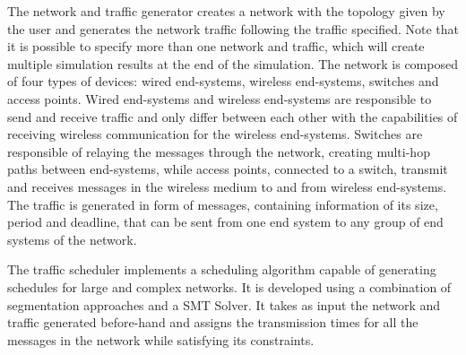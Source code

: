 \documentclass[conference]{IEEEtran}
\begin{document}
The network and traffic generator creates a network with the topology given by the user and generates the network traffic following the traffic specified. Note that it is possible to specify more than one network and traffic, which will create multiple simulation results at the end of the simulation. The network is composed of four types of devices: wired end-systems, wireless end-systems, switches and access points. Wired end-systems and wireless end-systems are responsible to send and receive traffic and only differ between each other with the capabilities of receiving wireless communication for the wireless end-systems. Switches are responsible of relaying the messages through the network, creating multi-hop paths between end-systems, while access points, connected to a switch, transmit and receives messages in the wireless medium to and from wireless end-systems. The traffic is generated in form of messages, containing information of its size, period and deadline, that can be sent from one end system to any group of end systems of the network.


The traffic scheduler implements a scheduling algorithm capable of generating schedules for large and complex networks. It is developed using a combination of segmentation approaches and a SMT Solver. It takes as input the network and traffic generated before-hand and assigns the transmission times for all the messages in the network while satisfying its constraints.
\end{document}
